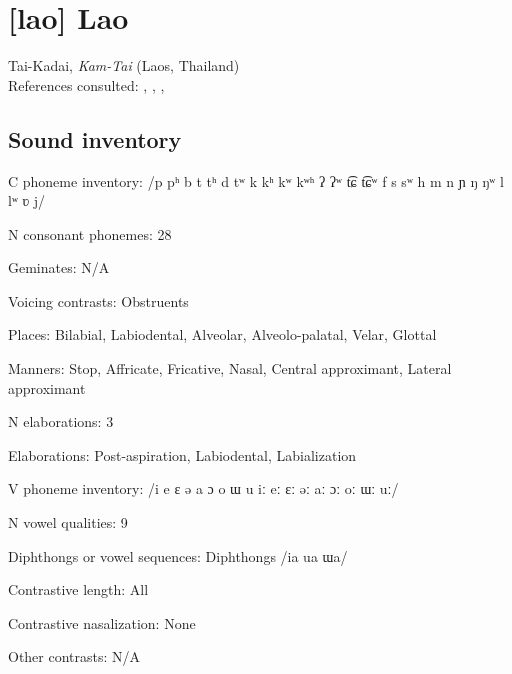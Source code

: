 {\section*{[lao] Lao}  %
Tai-Kadai, \textit{Kam-Tai} (Laos, Thailand)\medskip\\
References consulted: \citet{Enfield2004}, \citet{Enfield2007}, \citet{Erickson2001}, \citet{MorevEtAl1979}

\subsection*{Sound inventory}
\begin{appendixdesc}

\item[C phoneme inventory:] /p pʰ b t tʰ d tʷ k kʰ kʷ kʷʰ ʔ ʔʷ t͡ɕ t͡ɕʷ f s sʷ h m n ɲ ŋ ŋʷ l lʷ ʋ j/

\item[N consonant phonemes:] 28

\item[Geminates:] N/A

\item[Voicing contrasts:] Obstruents

\item[Places:] Bilabial, Labiodental, Alveolar, Alveolo-palatal, Velar, Glottal

\item[Manners:] Stop, Affricate, Fricative, Nasal, Central approximant, Lateral approximant

\item[N elaborations:] 3

\item[Elaborations:] Post-aspiration, Labiodental, Labialization

\item[V phoneme inventory:] /i e ɛ ə a ɔ o ɯ u iː eː ɛː əː aː ɔː oː ɯː uː/

\item[N vowel qualities:] 9

\item[Diphthongs or vowel sequences:] Diphthongs /ia ua ɯa/

\item[Contrastive length:] All

\item[Contrastive nasalization:] None

\item[Other contrasts:] N/A


\end{appendixdesc}}
